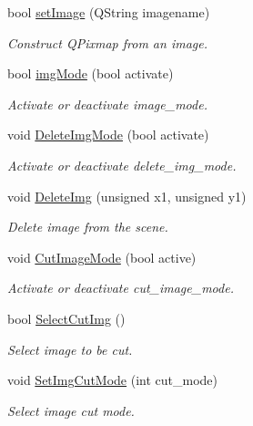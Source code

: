 \begin{DoxyCompactItemize}
\mbox{\label{classOwnGraphicsScene_ae83ee24e342b50c335af155a34295185}} 
bool \mbox{\hyperlink{classOwnGraphicsScene_ae83ee24e342b50c335af155a34295185}{set\+Image}} (Q\+String imagename)
\begin{DoxyCompactList}\small\item\em Construct Q\+Pixmap from an image. \end{DoxyCompactList}\item 
bool \mbox{\hyperlink{classOwnGraphicsScene_acc6e7978a3f10889e439ceabd155a341}{img\+Mode}} (bool activate)
\begin{DoxyCompactList}\small\item\em Activate or deactivate image\+\_\+mode. \end{DoxyCompactList}\item 
void \mbox{\hyperlink{classOwnGraphicsScene_aefe52a5b20dbb38dcc9d9510ecfabe52}{Delete\+Img\+Mode}} (bool activate)
\begin{DoxyCompactList}\small\item\em Activate or deactivate delete\+\_\+img\+\_\+mode. \end{DoxyCompactList}\item 
void \mbox{\hyperlink{classOwnGraphicsScene_abda962c04f88920377d3bb23b30b9267}{Delete\+Img}} (unsigned x1, unsigned y1)
\begin{DoxyCompactList}\small\item\em Delete image from the scene. \end{DoxyCompactList}\item 
void \mbox{\hyperlink{classOwnGraphicsScene_a3ce5a34cebcc134ecb20323c48e5812b}{Cut\+Image\+Mode}} (bool active)
\begin{DoxyCompactList}\small\item\em Activate or deactivate cut\+\_\+image\+\_\+mode. \end{DoxyCompactList}\item 
bool \mbox{\hyperlink{classOwnGraphicsScene_ae79aa179ce90ab26f06d7d17eed96b93}{Select\+Cut\+Img}} ()
\begin{DoxyCompactList}\small\item\em Select image to be cut. \end{DoxyCompactList}\item 
void \mbox{\hyperlink{classOwnGraphicsScene_a656919c9fdd0827ae182d3d3f5f91e4f}{Set\+Img\+Cut\+Mode}} (int cut\+\_\+mode)
\begin{DoxyCompactList}\small\item\em Select image cut mode. \end{DoxyCompactList}\item 

\end{DoxyCompactItemize}
